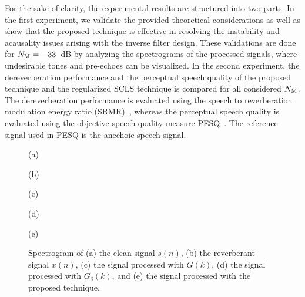 \documentclass{article}
\begin{document}
For the sake of clarity, the experimental results are structured into two parts. 
In the first experiment, we validate the provided theoretical considerations as well as show that the proposed technique is effective in resolving the instability and acausality issues arising with the inverse filter design. 
These validations are done for $N_{\rm M} = -33$~dB by analyzing the spectrograms of the processed signals, where undesirable tones and pre-echoes can be visualized.  
In the second experiment, the dereverberation performance and the perceptual speech quality of the proposed technique and the regularized SCLS technique is compared for all considered $N_{\rm M}$.
The dereverberation performance is evaluated using the speech to reverberation modulation energy ratio (SRMR)~\cite{Falk_IWAENC_2008}, whereas the perceptual speech quality is evaluated using the objective speech quality measure PESQ~\cite{PESQ}. 
The reference signal used in PESQ is the anechoic speech signal.
\begin{figure}[b!]
  \centering
  \hspace{-0.4cm} 

  \vspace{-0.35cm}
  {\small (a)}

  \vspace{-0.15cm}
  \hspace{-0.4cm} 

  \vspace{-0.35cm}
  {\small (b)}

  \vspace{-0.15cm}
  \hspace{-0.4cm} 

  \vspace{-0.35cm}
  {\small (c)}

  \vspace{-0.15cm}
  \hspace{-0.4cm} 

  \vspace{-0.35cm}
  {\small (d)}

  \vspace{-0.15cm}
  \hspace{-0.4cm} 

  \vspace{-0.15cm}
  {\small (e)}
  \vspace{-0.15cm}
  \caption{Spectrogram of (a) the clean signal $s(n)$, (b) the reverberant signal $x(n)$, (c) the signal processed with $G(k)$, (d) the signal processed with $G_{\delta}(k)$, and (e) the signal processed with the proposed technique.}
  \label{fig: spectras}
\end{figure}
\end{document}
